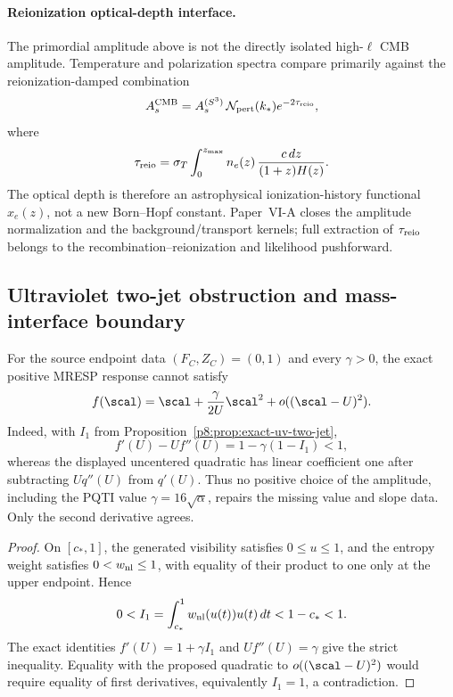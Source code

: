 \documentclass[12pt,a4paper]{article}
\begin{document}
\paragraph{Reionization optical-depth interface.}
The primordial amplitude above is not the directly isolated high-\(\ell\) CMB amplitude.  Temperature and polarization spectra compare primarily against the reionization-damped combination
\begin{equation}
\label{p8:eq:As-tau-interface}
A_s^{\rm CMB}=A_s^{(S^3)}\,\mathcal N_{\rm pert}(k_*)e^{-2\tau_{\rm reio}},
\end{equation}
where
\begin{equation}
\label{p8:eq:tau-reio-functional}
\tau_{\rm reio}
=
\sigma_T\int_0^{z_{\rm max}} n_e(z)\,\frac{c\,dz}{(1+z)H(z)}.
\end{equation}
The optical depth is therefore an astrophysical ionization-history functional \(x_e(z)\), not a new Born--Hopf constant.  Paper~VI-A closes the amplitude normalization and the background/transport kernels; full extraction of \(\tau_{\rm reio}\) belongs to the recombination--reionization and likelihood pushforward.


\subsection{Ultraviolet two-jet obstruction and mass-interface boundary}
\label{p8:app:uv-two-jet-mass-boundary}

\begin{proposition}
\label{p8:prop:no-uncentered-uv-quadratic-tangent}
For the source endpoint data \((F_C,Z_C)=(0,1)\) and every \(\gamma>0\), the
exact positive MRESP response cannot satisfy
\[
 f(\scal)=\scal+\frac{\gamma}{2U}\scal^2
 +o((\scal-U)^2).
\]
Indeed, with \(I_1\) from
Proposition~\ref{p8:prop:exact-uv-two-jet},
\[
 f'(U)-Uf''(U)=1-\gamma(1-I_1)<1,
\]
whereas the displayed uncentered quadratic has linear coefficient one after
subtracting \(Uq''(U)\) from \(q'(U)\).  Thus no positive choice of the
amplitude, including the PQTI value
\(\gamma=16\sqrt\alpha\), repairs the missing value and
slope data.  Only the second derivative agrees.
\end{proposition}

\begin{proof}
On \([c_*,1]\), the generated visibility satisfies \(0\le u\le1\), and the
entropy weight satisfies \(0<w_{\rm nl}\le1\), with equality of their product
to one only at the upper endpoint.  Hence
\[
 0<I_1=\int_{c_*}^{1}w_{\rm nl}(u(t))u(t)\,dt<1-c_*<1.
\]
The exact identities \(f'(U)=1+\gamma I_1\) and \(Uf''(U)=\gamma\) give the
strict inequality.  Equality with the proposed quadratic to
\(o((\scal-U)^2)\) would require equality of first derivatives, equivalently
\(I_1=1\), a contradiction.
\end{proof}
\end{document}
